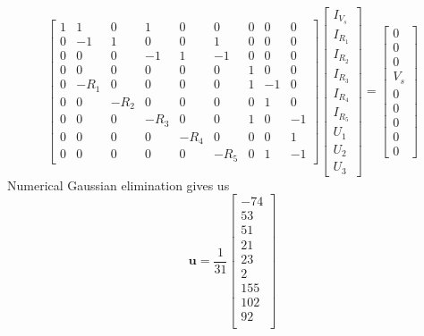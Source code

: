 \documentclass[]{article}
\begin{document}
\begin{equation}
	\begin{bmatrix}
	1 & 1 & 0 & 1 & 0 & 0 & 0 & 0 & 0 \\
	0 & -1 & 1 & 0 & 0 & 1 & 0 & 0 & 0 \\
	0 & 0 & 0 & -1 & 1 & -1 & 0 & 0 & 0 \\
	0 & 0 & 0 & 0 & 0 & 0 & 1 & 0 & 0 \\
	0 & -R_1 & 0 & 0 & 0 & 0 & 1 & -1 & 0 \\
	0 & 0 & -R_2 & 0 & 0 & 0 & 0 & 1 & 0  \\
	0 & 0 & 0 & -R_3 & 0 & 0 & 1 & 0 & -1 \\
	0 & 0 & 0 & 0 & -R_4 & 0 & 0 & 0 & 1 \\
	0 & 0 & 0 & 0 & 0 & -R_5 & 0 & 1 & -1
	\end{bmatrix}
	\begin{bmatrix}
	I_{V_s} \\
	I_{R_1} \\
	I_{R_2} \\
	I_{R_3} \\
	I_{R_4} \\
	I_{R_5} \\
	U_1 \\
	U_2 \\
	U_3
	\end{bmatrix}
	=
	\begin{bmatrix}
	0 \\
	0 \\
	0 \\
	V_s \\
	0 \\
	0 \\
	0 \\
	0 \\
	0
	\end{bmatrix}
\end{equation}
Numerical Gaussian elimination gives us 
\begin{equation}
	\mathbf{u} = 
	\frac{1}{31}\begin{bmatrix}
	-74 \\
	53 \\
	51 \\
	21 \\
	23 \\
	2 \\
	155 \\
	102 \\
	92 \\
	\end{bmatrix}
\end{equation}
\end{document}
